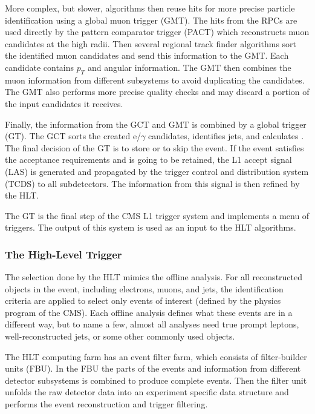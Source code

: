 \begin{normalsize}
More complex, but slower, algorithms then reuse hits for more precise particle identification using a global muon trigger (GMT). The hits from the RPCs are used directly by the pattern comparator trigger (PACT) which reconstructs muon candidates at the high radii. Then several regional track finder algorithms sort the identified muon candidates and send this information to the GMT. Each candidate contains $p_T$ and angular information. The GMT then combines the muon information from different subsystems to avoid duplicating the candidates. The GMT also performs more precise quality checks and may discard a portion of the input candidates it receives. 

Finally, the information from the GCT and GMT is combined by a global trigger (GT). The GCT sorts the created e/$\gamma$ candidates, identifies jets, and calculates \ETslash. The final decision of the GT is to store or to skip the event. If the event satisfies the acceptance requirements and is going to be retained, the L1 accept signal (LAS) is generated and propagated by the trigger control and distribution system (TCDS) to all subdetectors. The information from this signal is then refined by the HLT.


The GT is the final step of the CMS L1 trigger system and implements a menu of triggers. The output of this system is used as an input to the HLT algorithms. 



\subsubsection{The High-Level Trigger}

The selection done by the HLT mimics the offline analysis. For all reconstructed objects in the event, including electrons, muons, and jets, the identification criteria are applied to select only events of interest (defined by the physics program of the CMS). Each offline analysis defines what these events are in a different way, but to name a few, almost all analyses need true prompt leptons, well-reconstructed jets, or some other commonly used objects. 


The HLT computing farm has an event filter farm, which consists of filter-builder units (FBU). In the FBU the parts of the events and information from different detector subsystems is combined to produce complete events. Then the filter unit unfolds the raw detector data into an experiment specific data structure and performs the event reconstruction and trigger filtering. 



\end{normalsize}
